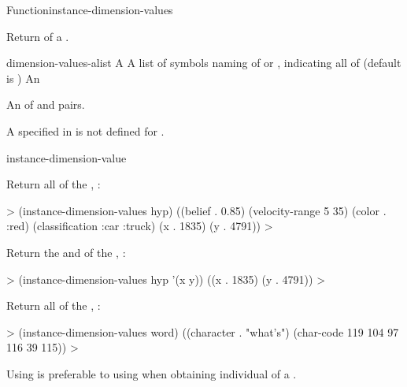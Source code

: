 \documentclass[10pt,twoside,english,pdftex]{article}
\begin{document}
\begin{functiondoc}{Function}{instance-dimension-values}%
  {
    }
%
%

\fnsyntax

\fnpurpose Return  of a .

\fnpackage {}

\fnmodule {}

\fnargs
\begin{args}{dimension-values-alist}
 A 
 A list of symbols naming  of
   or , indicating all  of 
   (default is )
 An 
\end{args}

\fnreturns An  of  and
 pairs.

\fnerrors A  specified in  is not
defined for .

\begin{alsos}{instance-dimension-value}
\also[dimensions-of]
\end{alsos}

\fnexamples
%
Return all  of the , :
%
\W\supp
\begin{example}
  > (instance-dimension-values hyp)
  ((belief . 0.85) (velocity-range 5 35) (color . :red)
   (classification :car :truck) (x . 1835) (y . 4791))
  >
\end{example}
%
Return the  and   of the
, :
%
\W\supp\notpretop
\begin{example}
  > (instance-dimension-values hyp '(x y))
  ((x . 1835) (y . 4791))
  >
\end{example}

Return all  of the , :
%
\W\supp
\begin{example}
  > (instance-dimension-values word)
  ((character . "what's") (char-code 119 104 97 116 39 115))
  >
\end{example}

\fnnote Using  is preferable
to using  when obtaining individual
 of a .

\end{functiondoc}
\end{document}
